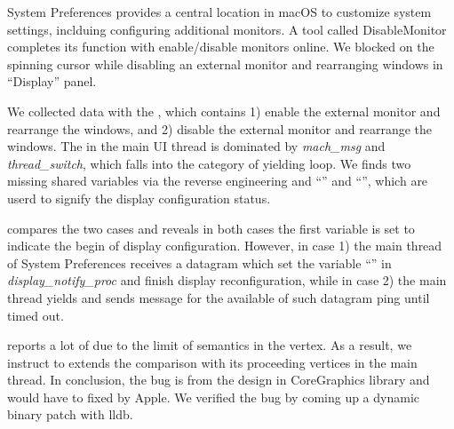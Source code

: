 System Preferences provides a central location in macOS to customize
system settings, inclduing configuring additional monitors. A tool called
DisableMonitor~\cite{disablemonitor} completes its function with enable/disable
monitors online. We blocked on the spinning cursor while disabling an external
monitor and rearranging windows in ``Display'' panel.

We collected data with the \xxx, which contains 1) enable the external
monitor and rearrange the windows, and 2) disable the external monitor and
rearrange the windows. The \spinningnode in the main UI thread is dominated by
\textit{mach\_msg} and \textit{thread\_switch}, which falls into the category of
yielding loop. We finds two missing shared variables via the reverse engineering
and ``'' and ``'',
which are userd to signify the display configuration status.

\xxx compares the two cases and reveals in both cases the first variable is
set to indicate the begin of display configuration. However, in case 1) the
main thread of System Preferences receives a datagram which set the variable
``'' in \textit{display\_notify\_proc} and finish
display reconfiguration, while in case 2) the main thread yields and sends
message for the available of such datagram ping until timed out.

\xxx reports a lot of \similarnodes due to the limit of semantics
in the vertex. As a result, we instruct \xxx to extends the comparison with its
proceeding vertices in the main thread. In conclusion, the bug is from the design
in CoreGraphics library and would have to fixed by Apple. We verified the bug by
coming up a dynamic binary patch with lldb.

